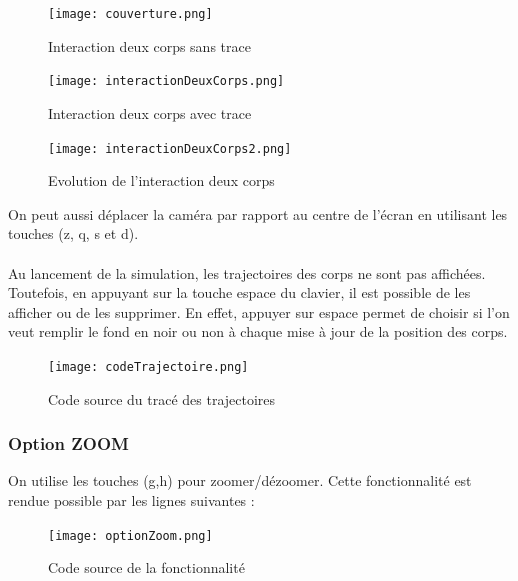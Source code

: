 \documentclass[a4paper, 12pt]{article}
\begin{document}
	\begin{figure}[H]
    	\centering
        \begin{minipage}{0.2\linewidth}
        	\centering
        	\texttt{[image: couverture.png]}
        	\caption{\label{fig:DeuxCorps1} Interaction deux corps sans trace}
    	\end{minipage}
        \hspace{0.05\linewidth}  %
    	\begin{minipage}{0.2\linewidth}
        	\centering
        	\texttt{[image: interactionDeuxCorps.png]}
        	\caption{\label{fig:DeuxCorps2} Interaction deux corps avec trace}
    	\end{minipage}
    	\hspace{0.05\linewidth}  %
    	\begin{minipage}{0.2\linewidth}
        	\centering
        	\texttt{[image: interactionDeuxCorps2.png]}
        	\caption{\label{fig:DeuxCorps3} Evolution de l'interaction deux corps} 
    	\end{minipage}
	\end{figure} 

On peut aussi déplacer la caméra par rapport au centre de l'écran en utilisant les touches (z, q, s et d).
\paragraph{}
Au lancement de la simulation, les trajectoires des corps ne sont pas affichées. Toutefois, en appuyant sur la touche espace du clavier, il est possible de les afficher ou de les supprimer. En effet, appuyer sur espace permet de choisir si l'on veut remplir le fond en noir ou non à chaque mise à jour de la position des corps.

\begin{figure}[H]
		\centering
		\texttt{[image: codeTrajectoire.png]}
		\caption{\label{fig: Source} Code source du tracé des trajectoires}  
	\end{figure}


\subsubsection{Option ZOOM}
On utilise les touches (g,h) pour zoomer/dézoomer. Cette fonctionnalité est rendue possible par les lignes suivantes :

	\begin{figure}[H]
		\centering
		\texttt{[image: optionZoom.png]}
		\caption{\label{fig: Source} Code source de la fonctionnalité}  
	\end{figure}
\end{document}
